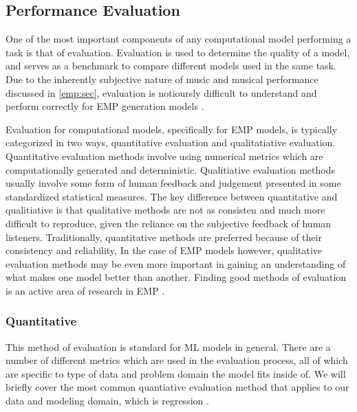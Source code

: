 \subsection{Performance Evaluation}\label{sec:evaluation}
One of the most important components of any computational model performing a task is that of evaluation. Evaluation is used to determine the quality of a model, and serves as a benchmark to compare different models used in the same task. Due to the inherently subjective nature of music and musical performance discussed in \ref{emp:sec}, evaluation is notioursly difficult to understand and perform correctly for EMP generation models \cite{cancino2018computational}. 

Evaluation for computational models, specifically for EMP models, is typically categorized in two ways, quantitative evaluation and qualitatiative evaluation. Quantitative evaluation methods involve using numerical metrics which are computationally generated and deterministic. Qualitiative evaluation methods usually involve some form of human feedback and judgement presented in some standardized statistical measures. The key difference between quantitative and qualitiative is that qualitative methods are not as consisten and much more difficult to reproduce, given the reliance on the subjective feedback of human listeners. Traditionally, quantitative methods are preferred because of their consistency and reliability, In the case of EMP models however, qualitative evaluation methods may be even more important in gaining an understanding of what makes one model better than another. Finding good methods of evaluation is an active area of research in EMP \cite{cancino2018computational}. 

\subsubsection{Quantitative}
This method of evaluation is standard for ML models in general. There are a number of different metrics which are used in the evaluation process, all of which are specific to type of data and problem domain the model fits inside of. We will briefly cover the most common quantiative evaluation method that applies to our data and modeling domain, which is regression . 


